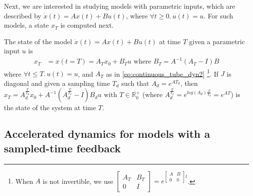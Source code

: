 \documentclass[a4paper,UKenglish]{lipics-v2018}
\newcommand{\mat}[1]{{#1}}
\renewcommand{\vec}[1]{{#1}}
\begin{document}
Next, we are interested in studying models with parametric inputs, which are
described by $\dot{\vec{x}}(t)=\mat{A}\vec{x}(t)+\mat{B}\vec{u}(t)$, where
$\forall t\geq 0.\,\vec{u}(t)=\vec{u}$.  For such models, a state $\vec{x}_T$
is computed next.
%
\begin{lemma}
%
The state of the model
$\dot{\vec{x}}(t)=\mat{A}\vec{x}(t)+\mat{B}\vec{u}(t)$ at time $T$ given a
parametric input $\vec{u}$ is
%
\begin{align}
\vec{x}_T&=\vec{x}(t=T)=\mat{A}_T\vec{x}_0 + \mat{B}_T\vec{u} \text{ where } \mat{B}_T=\mat{A}^{-1}(\mat{A}_T-\mat{I})\mat{B} 
\label{eq:continuous_tube_param}
\end{align}
%
where $\forall t \leq T.\, \vec{u}(t)=\vec{u}$, and $\mat{A}_T$ as in
\eqref{eq:continuous_tube_dyn2} \footnote{When $\mat{A}$ is not invertible,
we use $\left[\begin{array}{cc}\mat{A}_T&\mat{B}_T\\
0&\mat{I}\end{array}\right]=e^{\left[\begin{array}{cc}\mat{A}&\mat{B}\\0&0\end{array}\right]t}$.}. 
If $\mat{J}$ is diagonal and given a sampling time $T_d$ such that
$A_d=e^{\mat{A} T_d}$, then
$\vec{x}_T=A_d^{\frac{T}{T_d}}\vec{x}_0+\mat{A}^{-1}(\mat{A}_d^{\frac{T}{T_d}}-\mat{I})\mat{B}_d\vec{u}
\text{ with } T \in \mathbb{R}_0^+$ (where $\mat{A}_d^{\frac{T}{T_d}} =
e^{log(\mat{A}_d) \frac{T}{T_d}} = e^{\mat{A} T}$) is the state of the
system at time $T$.
%
\end{lemma}

\subsection{Accelerated dynamics for models with a sampled-time feedback}\label{sec:real_discrete_feedback_inputs}
\end{document}
